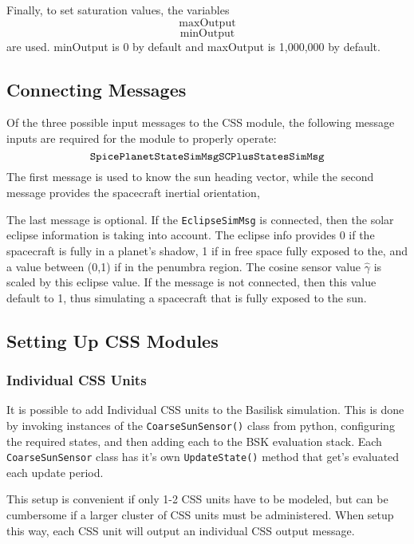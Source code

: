 Finally, to set saturation values, the variables
$$
	\mathrm{maxOutput}
	$$
	$$
	\mathrm{minOutput}
$$
are used. minOutput is  0 by default and maxOutput is 1,000,000 by default.

\subsection{Connecting Messages}
Of the three possible input messages to the CSS module, the following message inputs are required for the module to properly operate:
$$
	{\tt SpicePlanetStateSimMsg} \\
	{\tt SCPlusStatesSimMsg}
$$
The first message is used to know the sun heading vector, while the second message provides the spacecraft inertial orientation,

The last message is optional.  If the {\tt EclipseSimMsg} is connected, then the solar eclipse information is taking into account.  The eclipse info provides 0 if the spacecraft is fully in a planet's shadow, 1 if in free space fully exposed to the, and a value between (0,1) if in the penumbra region.  The cosine sensor value $\hat\gamma$ is scaled by this eclipse value.  If the message is not connected, then this value default to 1, thus simulating a spacecraft that is fully exposed to the sun.  



\subsection{Setting Up CSS Modules}
\subsubsection{Individual CSS Units}
It is possible to add Individual CSS units to the Basilisk simulation.   This is done by invoking instances of the {\tt CoarseSunSensor()} class from python, configuring the required states, and then adding each to the BSK evaluation stack.  Each {\tt CoarseSunSensor} class has it's own {\tt UpdateState()} method that get's evaluated each update period.  

This setup is convenient if only 1-2 CSS units have to be modeled, but can be cumbersome if a larger cluster of CSS units must be administered.  When setup this way, each CSS unit will output an individual CSS output message.


